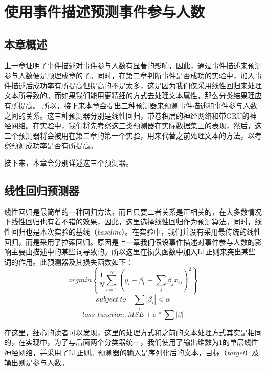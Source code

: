 \documentclass[12pt]{template}
\begin{document}
\section{使用事件描述预测事件参与人数}
\subsection{本章概述}
上一章证明了事件描述对事件参与人数有显著的影响，因此，通过事件描述来预测参与人数便是顺理成章的了。同时，在第二章判断事件是否成功的实验中，加入事件描述后成功率有所提高但提高的不是太多，这是因为我们仅采用线性回归来处理文本所导致的。而如果我们能用更精细的方式去处理文本属性，那么分类结果理应有所提高。 所以，接下来本章会提出三种预测器来预测事件描述和事件参与人数之间的关系。这三种预测器分别是线性回归，带卷积层的神经网络和带GRU的神经网络。在实验中，我们将先考察这三类预测器在实际数据集上的表现，然后，这三个预测器将会被用在第二章的第一个实验，用来代替之前处理文本的方法，以考察预测成功率是否有所提高。

接下来，本章会分别详述这三个预测器。

\subsection{线性回归预测器}
线性回归是最简单的一种回归方法，而且只要二者关系是正相关的，在大多数情况下线性回归也有着不错的效果，因此，这里选择线性回归作为预测算法。同时，线性回归也是本次实验的基线（\textit{baseline}）。在实验中，我们并没有采用最传统的线性回归，而是采用了拉索回归。原因是上一章我们假设事件描述对事件参与人数的影响主要由描述中的某些词导致的。所以这里在损失函数中加入L1正则来突出某些词的作用。此预测器及其损失函数如下：
\begin{equation}
argmin\left\{\frac{1}{N}\displaystyle\sum_{i=1}^{N}
(y_i-\beta_0-\displaystyle\sum_{j}\beta_jx_{ij})^2\right\}
\end{equation}
\begin{equation}
subject\ to \quad \displaystyle\sum_{i}|\beta_i|<\alpha
\end{equation}
\begin{equation}
loss\ function: MSE+\sigma*\sum|\beta|
\end{equation}

在这里，细心的读者可以发现，这里的处理方式和之前的文本处理方式其实是相同的，在实现中，为了与后面两个分类器统一，我们使用了输出维数为1的单层线性神经网络，并采用了L1正则。预测器的输入是序列化后的文本，目标（\textit{target}）及输出则是参与人数。
\end{document}
